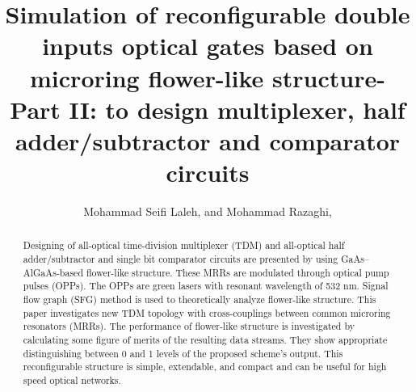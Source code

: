 \documentclass{osa-article}
\begin{document}
\title{Simulation of reconfigurable double inputs optical gates based on microring flower-like structure- Part II: to design multiplexer, half adder/subtractor and comparator circuits}

\author{Mohammad Seifi Laleh, and Mohammad Razaghi,}

\address{Dept. of Electrical Engineering, University of Kurdistan, Sanandaj, Iran}




\begin{abstract}
Designing of all-optical time-division multiplexer (TDM) and all-optical half adder/subtractor and single bit comparator circuits are presented by using GaAs–AlGaAs-based flower-like structure. These MRRs are modulated through optical pump pulses (OPPs). The OPPs are green lasers with resonant wavelength of 532 nm. Signal flow graph (SFG) method is used to theoretically analyze flower-like structure. This paper investigates new TDM topology with cross-couplings between common microring resonators (MRRs). The performance of flower-like structure is investigated by calculating some figure of merits of the resulting data streams. They show appropriate distinguishing between 0 and 1 levels of the proposed scheme’s output. This reconfigurable structure is simple, extendable, and compact and can be useful for high speed optical networks. 
\end{abstract}

\end{document}
